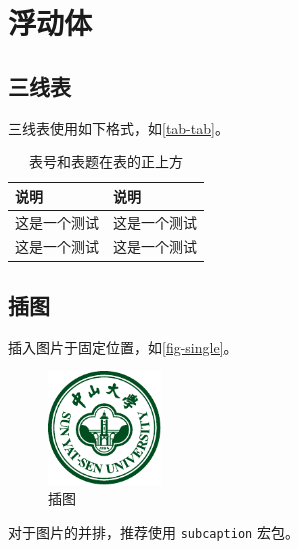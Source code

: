 \section{浮动体}

\subsection{三线表}

三线表使用如下格式，如\autoref{tab-tab}。

\begin{table}[H]
    \centering
    \caption{表号和表题在表的正上方}
    \label{tab-tab}
    \begin{tabular}{ll}
        \toprule
        说明     & 说明     \\
        \midrule
        这是一个测试 & 这是一个测试 \\
        这是一个测试 & 这是一个测试 \\
        \bottomrule
    \end{tabular}
\end{table}

\subsection{插图}

插入图片于固定位置，如\autoref{fig-single}。
\begin{figure}[H]
    \centering
    \includegraphics[width=3cm]{figures/sysu-badge.pdf}
    \caption{插图}
    \label{fig-single}
\end{figure}

对于图片的并排，推荐使用 \verb|subcaption| 宏包。

